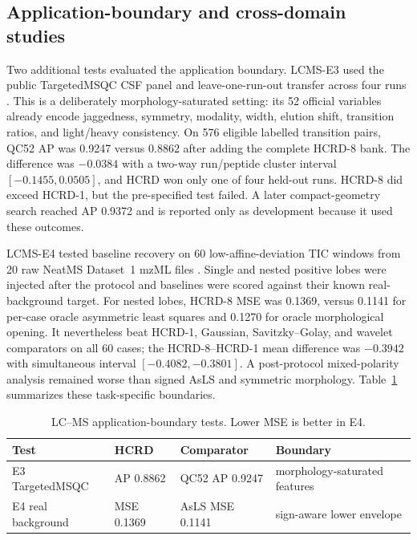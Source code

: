 \subsection{Application-boundary and cross-domain studies}
Two additional tests evaluated the application boundary. LCMS-E3 used the public
TargetedMSQC CSF panel and leave-one-run-out transfer across four runs
\citep{eshghi2018targetedmsqc}.  This is a deliberately morphology-saturated
setting: its 52 official variables already encode jaggedness, symmetry,
modality, width, elution shift, transition ratios, and light/heavy consistency.
On 576 eligible labelled transition pairs, QC52 AP was 0.9247 versus 0.8862
after adding the complete HCRD-8 bank.  The difference was $-0.0384$ with a
two-way run/peptide cluster interval $[-0.1455,0.0505]$, and HCRD won only one
of four held-out runs.  HCRD-8 did exceed HCRD-1, but the pre-specified test
failed.  A later compact-geometry search reached AP 0.9372 and is reported only
as development because it used these outcomes.

LCMS-E4 tested baseline recovery on 60 low-affine-deviation TIC windows from
20 raw NeatMS Dataset~1 mzML files \citep{gloaguen2022neatms}.  Single and
nested positive lobes were injected after the protocol and baselines were
scored against their known real-background target.  For nested lobes, HCRD-8
MSE was 0.1369, versus 0.1141 for per-case oracle asymmetric least squares and
0.1270 for oracle morphological opening.  It nevertheless beat HCRD-1,
Gaussian, Savitzky--Golay, and wavelet comparators on all 60 cases; the
HCRD-8--HCRD-1 mean difference was $-0.3942$ with simultaneous interval
$[-0.4082,-0.3801]$.  A post-protocol mixed-polarity analysis remained worse
than signed AsLS and symmetric morphology. Table~\ref{tab:lcms-boundaries}
summarizes these task-specific boundaries.

\begin{table}[H]
\centering
\caption{LC--MS application-boundary tests. Lower MSE is better in E4.}
\label{tab:lcms-boundaries}
\small
\begin{tabular}{>{\raggedright\arraybackslash}p{3.7cm}ll>{\raggedright\arraybackslash}p{4.5cm}}
\toprule
Test & HCRD & Comparator & Boundary \\
\midrule
E3 TargetedMSQC & AP 0.8862 & QC52 AP 0.9247 & morphology-saturated features \\
E4 real background & MSE 0.1369 & AsLS MSE 0.1141 & sign-aware lower envelope \\
\bottomrule
\end{tabular}
\end{table}

